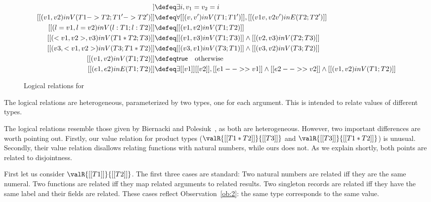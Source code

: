 \begin{figure}[t]
  \centering
  \begin{small}
\begin{align*}
  [[(v1 , v2) in V ( nat ; nat )]] &\defeq \exists i, v_1 = v_2 = i \\
  [[(v1, v2) in V (T1 -> T2 ; T1' -> T2')]] &\defeq \forall [[(v, v') in V (T1 ; T1')]], [[(v1 v, v2 v') in E (T2 ; T2')]] \\
  [[( {l = v1} , {l = v2}) in V ( {l : T1} ; { l : T2 } )]] &\defeq [[(v1, v2) in V (T1; T2)]] \\
  [[(<v1, v2> , v3) in V (T1 * T2 ; T3)]] &\defeq [[(v1, v3) in V (T1; T3)]] \land [[(v2, v3) in V (T2; T3)]] \\
  [[(v3, <v1, v2> ) in V (T3; T1 * T2)]] &\defeq [[(v3, v1) in V (T3; T1)]] \land [[(v3, v2) in V (T3; T2)]] \\
  [[(v1 , v2) in V (T1; T2)]]  &\defeq \mathsf{true} \quad \text{otherwise} \\
  [[(e1, e2) in E (T1; T2)]] &\defeq \exists [[v1]] [[v2]], [[e1 -->> v1]] \land [[e2 -->> v2]] \land [[(v1, v2) in V (T1; T2)]]
\end{align*}
  \end{small}
  \caption{Logical relations for \tname}
  \label{fig:logical}
\end{figure}


\begin{remark}
  The logical relations are heterogeneous, parameterized by two types, one for
  each argument. This is intended to relate values of different types.
\end{remark}


\begin{remark}
  The logical relations resemble those given by Biernacki and Polesiuk~\cite{biernacki2015logical}, as
  both are heterogeneous. However, two important differences are worth pointing
  out. Firstly, our value relation for product types ($\valR{[[T1 * T2]]}{[[T3]]}$ and $\valR{[[T3]]}{[[T1 * T2]]}$) is unusual.
  Secondly, their value relation disallows relating functions with natural numbers, while
  ours does not. As we explain shortly, both points are related to disjointness.
\end{remark}


First let us consider $\valR{[[T1]]}{[[T2]]}$. The first three cases are
standard: Two natural numbers are related iff they are the same numeral. Two
functions are related iff they map related arguments to related results. Two
singleton records are related iff they have the same label and their fields are
related. These cases reflect Observation~\ref{ob:2}: the same type
corresponds to the same value.

